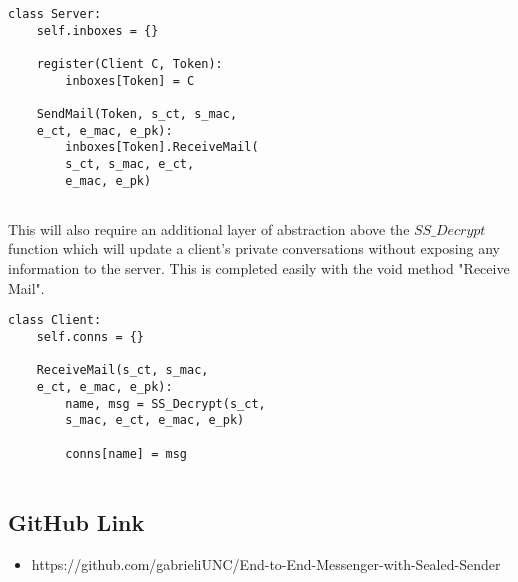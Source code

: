 \documentclass[conference]{IEEEtran}
\begin{document}
\begin{Verbatim}[frame=single]
class Server:
    self.inboxes = {}
    
    register(Client C, Token):
        inboxes[Token] = C

    SendMail(Token, s_ct, s_mac, 
    e_ct, e_mac, e_pk):
        inboxes[Token].ReceiveMail(
        s_ct, s_mac, e_ct, 
        e_mac, e_pk)
        
\end{Verbatim}

This will also require an additional layer of abstraction above the $SS\_Decrypt$ function which will update a client's private conversations without exposing any information to the server. This is completed easily with the void method "Receive Mail".
\newline

\begin{Verbatim}[frame=single]
class Client:
    self.conns = {}

    ReceiveMail(s_ct, s_mac, 
    e_ct, e_mac, e_pk):
        name, msg = SS_Decrypt(s_ct,
        s_mac, e_ct, e_mac, e_pk)

        conns[name] = msg
        
\end{Verbatim}



\subsection{GitHub Link}
\begin{itemize}
\item https://github.com/gabrieliUNC/End-to-End-Messenger-with-Sealed-Sender
\end{itemize}
\end{document}
